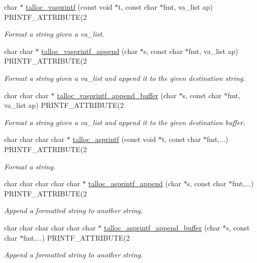 \begin{DoxyCompactItemize}
char $\ast$ \hyperlink{group__talloc__string_gaea795b4898d8b24424595c6ce1f05d9c}{talloc\+\_\+vasprintf} (const void $\ast$t, const char $\ast$fmt, va\+\_\+list ap) P\+R\+I\+N\+T\+F\+\_\+\+A\+T\+T\+R\+I\+B\+U\+T\+E(2
\begin{DoxyCompactList}\small\item\em Format a string given a va\+\_\+list. \end{DoxyCompactList}\item 
char char $\ast$ \hyperlink{group__talloc__string_gaba57dc43e539b05a7ce372e02085dc0a}{talloc\+\_\+vasprintf\+\_\+append} (char $\ast$s, const char $\ast$fmt, va\+\_\+list ap) P\+R\+I\+N\+T\+F\+\_\+\+A\+T\+T\+R\+I\+B\+U\+T\+E(2
\begin{DoxyCompactList}\small\item\em Format a string given a va\+\_\+list and append it to the given destination string. \end{DoxyCompactList}\item 
char char char $\ast$ \hyperlink{group__talloc__string_ga224062e19a3fbbd4d433329446d71b1c}{talloc\+\_\+vasprintf\+\_\+append\+\_\+buffer} (char $\ast$s, const char $\ast$fmt, va\+\_\+list ap) P\+R\+I\+N\+T\+F\+\_\+\+A\+T\+T\+R\+I\+B\+U\+T\+E(2
\begin{DoxyCompactList}\small\item\em Format a string given a va\+\_\+list and append it to the given destination buffer. \end{DoxyCompactList}\item 
char char char char $\ast$ \hyperlink{group__talloc__string_ga6e7b94bee0fea217f9622a5966425651}{talloc\+\_\+asprintf} (const void $\ast$t, const char $\ast$fmt,...) P\+R\+I\+N\+T\+F\+\_\+\+A\+T\+T\+R\+I\+B\+U\+T\+E(2
\begin{DoxyCompactList}\small\item\em Format a string. \end{DoxyCompactList}\item 
char char char char char $\ast$ \hyperlink{group__talloc__string_ga26111c96a2f232cc80fabdf248412a51}{talloc\+\_\+asprintf\+\_\+append} (char $\ast$s, const char $\ast$fmt,...) P\+R\+I\+N\+T\+F\+\_\+\+A\+T\+T\+R\+I\+B\+U\+T\+E(2
\begin{DoxyCompactList}\small\item\em Append a formatted string to another string. \end{DoxyCompactList}\item 
char char char char char char $\ast$ \hyperlink{group__talloc__string_ga32abeb90f6e1aa9f9877f31d4952f563}{talloc\+\_\+asprintf\+\_\+append\+\_\+buffer} (char $\ast$s, const char $\ast$fmt,...) P\+R\+I\+N\+T\+F\+\_\+\+A\+T\+T\+R\+I\+B\+U\+T\+E(2
\begin{DoxyCompactList}\small\item\em Append a formatted string to another string. \end{DoxyCompactList}\end{DoxyCompactItemize}


